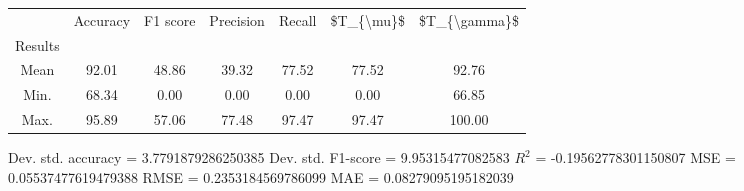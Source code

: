 \begin{tabular}{|c|c|c|c|c|c|c|}
\toprule
{} &  Accuracy &  F1 score &  Precision &  Recall &  \$T\_\{\textbackslash mu\}\$ &  \$T\_\{\textbackslash gamma\}\$ \\
Results &           &           &            &         &            &               \\
\hline
Mean    &     92.01 &     48.86 &      39.32 &   77.52 &      77.52 &         92.76 \\
Min.    &     68.34 &      0.00 &       0.00 &    0.00 &       0.00 &         66.85 \\
Max.    &     95.89 &     57.06 &      77.48 &   97.47 &      97.47 &        100.00 \\
\bottomrule
\end{tabular}

 Dev. std. accuracy = 3.7791879286250385
 Dev. std. F1-score = 9.95315477082583
 $R^2$ = -0.19562778301150807
 MSE = 0.05537477619479388
 RMSE = 0.2353184569786099
 MAE = 0.08279095195182039
